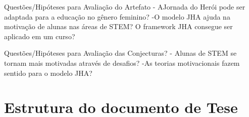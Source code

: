 Questões/Hipóteses para Avaliação do Artefato
- AJornada do Herói pode ser adaptada para a educação no gênero feminino?
-O modelo JHA ajuda na motivação de alunas nas áreas de STEM?
O framework JHA consegue ser aplicado em um curso?


Questões/Hipóteses para Avaliação das Conjecturas?
- Alunas de STEM se tornam mais motivadas através de desafios?
-As teorias motivacionais fazem sentido para o modelo JHA?

\section{Estrutura do documento de Tese}




